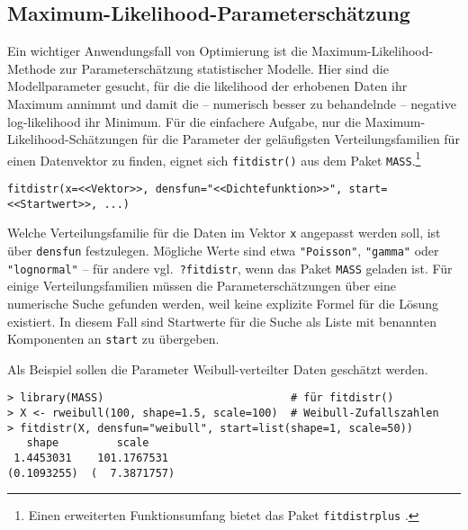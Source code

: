 \subsection{Maximum-Likelihood-Parameterschätzung}
\label{sec:fitDistr}

Ein wichtiger Anwendungsfall von Optimierung ist die Maximum-Likelihood-Methode zur Parameterschätzung statistischer Modelle. Hier sind die Modellparameter gesucht, für die die likelihood der erhobenen Daten ihr Maximum annimmt und damit die -- numerisch besser zu behandelnde -- negative log-likelihood ihr Minimum. Für die einfachere Aufgabe, nur die Maximum-Likelihood-Schätzungen für die Parameter der geläufigsten Verteilungsfamilien für einen Datenvektor zu finden, eignet sich \lstinline!fitdistr()! aus dem Paket \lstinline!MASS!.\footnote{Einen erweiterten Funktionsumfang bietet das Paket \lstinline!fitdistrplus! \cite{Delignette2015}.}
\begin{lstlisting}
fitdistr(x=<<Vektor>>, densfun="<<Dichtefunktion>>", start=<<Startwert>>, ...)
\end{lstlisting}

Welche Verteilungsfamilie für die Daten im Vektor \lstinline!x! angepasst werden soll, ist über \lstinline!densfun! festzulegen. Mögliche Werte sind etwa \lstinline!"Poisson"!, \lstinline!"gamma"! oder \lstinline!"lognormal"! -- für andere vgl.\ \lstinline!?fitdistr!, wenn das Paket \lstinline!MASS! geladen ist. Für einige Verteilungsfamilien müssen die Parameterschätzungen über eine numerische Suche gefunden werden, weil keine explizite Formel für die Lösung existiert. In diesem Fall sind Startwerte für die Suche als Liste mit benannten Komponenten an \lstinline!start! zu übergeben.

Als Beispiel sollen die Parameter Weibull-verteilter Daten geschätzt werden.
\begin{lstlisting}
> library(MASS)                             # für fitdistr()
> X <- rweibull(100, shape=1.5, scale=100)  # Weibull-Zufallszahlen
> fitdistr(X, densfun="weibull", start=list(shape=1, scale=50))
   shape         scale   
 1.4453031    101.1767531 
(0.1093255)  (  7.3871757)
\end{lstlisting}

